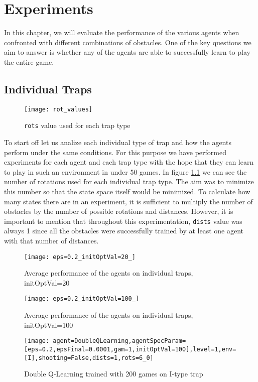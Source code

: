 \chapter{Experiments}
In this chapter, we will evaluate the performance of the various agents when confronted with different combinations of obstacles. One of the key questions we aim to answer is whether any of the agents are able to successfully learn to play the entire game.

\section{Individual Traps}
\begin{figure}[h]
    \centering
    \texttt{[image: rot\_values]}
    \caption{\texttt{rots} value used for each trap type}
    \label{fig:rot_values}
\end{figure}

To start off let us analize each individual type of trap and how the agents perform under the same conditions. For this purpose we have performed experiments for each agent and each trap type with the hope that they can learn to play in such an environment in under 50 games.  In figure \ref{fig:rot_values} we can see the number of rotations used for each individual trap type. The aim was to minimize this number so that the state space itself would be minimized. To calculate how many states there are in an experiment, it is sufficient  to multiply the number of obstacles by the number of possible rotations and distances. However, it is important to mention that throughout this experimentation, \texttt{dists} value was always 1 since all the obstacles were successfully trained by at least one agent with that number of distances.

\begin{figure}[h]
    \centering
    \texttt{[image: eps=0.2\_initOptVal=20\_]}
    \caption{Average performance of the agents on individual traps, initOptVal=20}
    \label{fig:avgiop20}
\end{figure}

\begin{figure}[h]
    \centering
    \texttt{[image: eps=0.2\_initOptVal=100\_]}
    \caption{Average performance of the agents on individual traps, initOptVal=100}
    \label{fig:avgiop100}
\end{figure}

\begin{figure}[h]
    \centering
    \texttt{[image: agent=DoubleQLearning,agentSpecParam=[eps=0.2,epsFinal=0.0001,gam=1,initOptVal=100],level=1,env=[I],shooting=False,dists=1,rots=6\_0]}
    \caption{Double Q-Learning trained with 200 games on I-type trap}
    \label{fig:dqli}
\end{figure}

